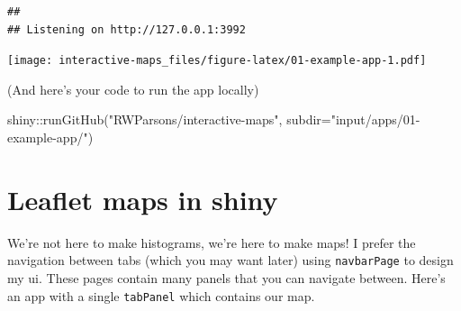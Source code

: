\documentclass[
]{book}
\newenvironment{Shaded}{\begin{snugshade}}{\end{snugshade}}
\newcommand{\AttributeTok}[1]{\textcolor[rgb]{0.77,0.63,0.00}{#1}}
\newcommand{\ControlFlowTok}[1]{\textcolor[rgb]{0.13,0.29,0.53}{\textbf{#1}}}
\newcommand{\DecValTok}[1]{\textcolor[rgb]{0.00,0.00,0.81}{#1}}
\newcommand{\FunctionTok}[1]{\textcolor[rgb]{0.00,0.00,0.00}{#1}}
\newcommand{\NormalTok}[1]{#1}
\newcommand{\OtherTok}[1]{\textcolor[rgb]{0.56,0.35,0.01}{#1}}
\newcommand{\SpecialCharTok}[1]{\textcolor[rgb]{0.00,0.00,0.00}{#1}}
\newcommand{\StringTok}[1]{\textcolor[rgb]{0.31,0.60,0.02}{#1}}
\begin{document}
\begin{Shaded}
\end{Shaded}

\begin{verbatim}
## 
## Listening on http://127.0.0.1:3992
\end{verbatim}

\texttt{[image: interactive-maps\_files/figure-latex/01-example-app-1.pdf]}

(And here's your code to run the app locally)

\begin{Shaded}
\begin{Highlighting}[]
\NormalTok{shiny}\SpecialCharTok{::}\FunctionTok{runGitHub}\NormalTok{(}\StringTok{"RWParsons/interactive{-}maps"}\NormalTok{, }\AttributeTok{subdir=}\StringTok{"input/apps/01{-}example{-}app/"}\NormalTok{)}
\end{Highlighting}
\end{Shaded}

\hypertarget{leaflet-maps-in-shiny}{%
\section{Leaflet maps in shiny}\label{leaflet-maps-in-shiny}}

We're not here to make histograms, we're here to make maps!
I prefer the navigation between tabs (which you may want later) using \texttt{navbarPage} to design my ui.
These pages contain many panels that you can navigate between. Here's an app with a single \texttt{tabPanel} which contains our map.
\end{document}
